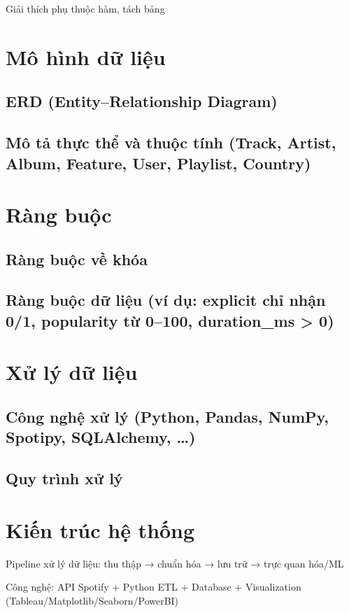 \documentclass{latex/hcmut-report}
\begin{document}
Giải thích phụ thuộc hàm, tách bảng

\section{Mô hình dữ liệu}
\subsection{ERD (Entity–Relationship Diagram)}
\subsection{Mô tả thực thể và thuộc tính (Track, Artist, Album, Feature, User, Playlist, Country)}

\section{Ràng buộc}
\subsection{Ràng buộc về khóa}
\subsection{Ràng buộc dữ liệu (ví dụ: explicit chỉ nhận 0/1, popularity từ 0–100, duration_ms > 0)}

\section{Xử lý dữ liệu}
\subsection{Công nghệ xử lý (Python, Pandas, NumPy, Spotipy, SQLAlchemy, …)}
\subsection{Quy trình xử lý}

\section{Kiến trúc hệ thống}
Pipeline xử lý dữ liệu: thu thập → chuẩn hóa → lưu trữ → trực quan hóa/ML

Công nghệ: API Spotify + Python ETL + Database + Visualization (Tableau/Matplotlib/Seaborn/PowerBI)
\end{document}
